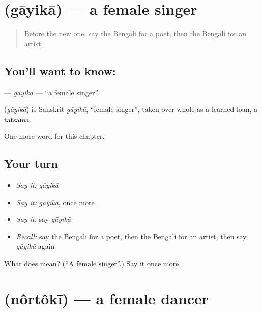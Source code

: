 \section[\texorpdfstring{\bn{গায়িকা} (gāyikā)}{গায়িকা (gāyikā)}]{ (gāyikā) — a female singer}

\label{lesson:BN-C262-gayika}



\begin{quote}
Before the new one: say the Bengali for a poet, then the Bengali for an artist.
\end{quote}

\subsection*{You'll want to know: }
\textbf{} — \emph{gāyikā} — \textquotedblleft{}a female singer\textquotedblright{}.

\begin{cousinweb}
\textbf{} (\emph{gāyikā}) is Sanskrit \emph{gāyikā}, \textquotedblleft{}female singer\textquotedblright{}, taken over whole as a learned loan, a tatsama.
\end{cousinweb}

\begin{grammarlens}[title={What you've built}]
One more word for this chapter.
\end{grammarlens}

\subsection*{Your turn}
\begin{itemize}
\raggedright
  \item \emph{Say it:} \emph{gāyikā}
  \item \emph{Say it:} \emph{gāyikā}, once more
  \item \emph{Say it:} say \emph{gāyikā}
  \item \emph{Recall:} say the Bengali for a poet, then the Bengali for an artist, then say \emph{gāyikā} again
\end{itemize}

\begin{tcolorbox}[breakable,colback=teal!4,colframe=teal!35!black,title={Before you move on}]
What does  mean? (\textquotedblleft{}A female singer\textquotedblright{}.) Say it once more.
\end{tcolorbox}
\section[\texorpdfstring{\bn{নর্তকী} (nôrtôkī)}{নর্তকী (nôrtôkī)}]{ (nôrtôkī) — a female dancer}

